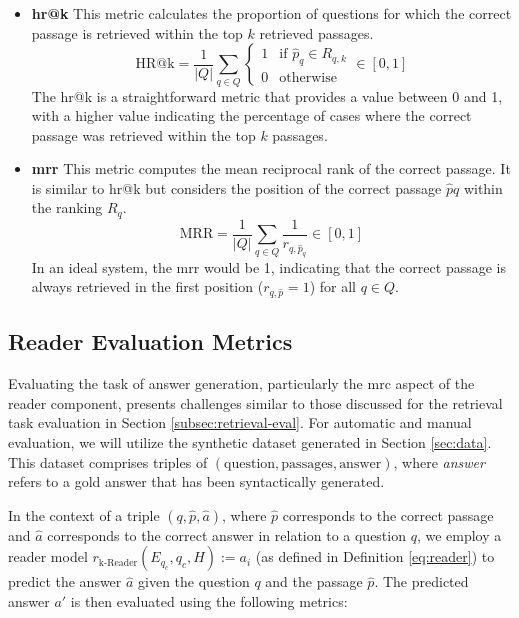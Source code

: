 \begin{itemize}
    \item \textbf{\gls{hr}@k} This metric calculates the proportion of questions for which the correct passage is retrieved within the top $k$ retrieved passages.
    \begin{equation}
        \text{HR@k} = \frac{1}{|Q|} \sum_{q \in Q} 
        \begin{cases}
            1 & \text{if } \hat{p}_q \in R_{q,k} \\
            0 & \text{otherwise}
        \end{cases}
        \in [0,1]
    \end{equation}
    The \gls{hr}@k is a straightforward metric that provides a value between 0 and 1, with a higher value indicating the percentage of cases where the correct passage was retrieved within the top $k$ passages.
    \item \textbf{\gls{mrr}} This metric computes the mean reciprocal rank of the correct passage. It is similar to \gls{hr}@k but considers the position of the correct passage $\hat{p}q$ within the ranking $R_q$.
    \begin{equation}
        \text{MRR} = \frac{1}{|Q|} \sum_{q \in Q} \frac{1}{r_{q,\hat{p}_q}} \in [0,1]
    \end{equation}
    In an ideal system, the \gls{mrr} would be 1, indicating that the correct passage is always retrieved in the first position ($r_{q,\hat{p}} = 1$) for all $q \in Q$.
\end{itemize}

\subsection{Reader Evaluation Metrics}
\label{subsec:answer-generation-eval}

Evaluating the task of answer generation, particularly the \gls{mrc} aspect of the reader component, presents challenges similar to those discussed for the retrieval task evaluation in Section \ref{subsec:retrieval-eval}. For automatic and manual evaluation, we will utilize the synthetic dataset generated in Section \ref{sec:data}. This dataset comprises triples of $(\text{question}, \text{passages}, \text{answer})$, where \textit{answer} refers to a gold answer that has been syntactically generated.

In the context of a triple $(q, \hat{p}, \hat{a})$, where $\hat{p}$ corresponds to the correct passage and $\hat{a}$ corresponds to the correct answer in relation to a question $q$, we employ a reader model $r_{\text{k-Reader}}(E_{q_c}, q_c,H) := a_i$ (as defined in Definition \ref{eq:reader}) to predict the answer $\hat{a}$ given the question $q$ and the passage $\hat{p}$. The predicted answer $a'$ is then evaluated using the following metrics:

